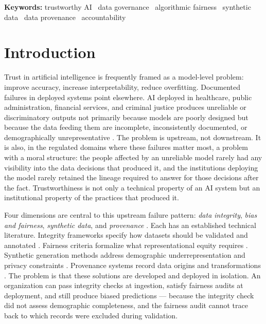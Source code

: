 \documentclass[11pt]{article}
\begin{document}
\vspace{0.5em}
\noindent\textbf{Keywords:} trustworthy AI \textperiodcentered\ data governance \textperiodcentered\ algorithmic fairness \textperiodcentered\ synthetic data \textperiodcentered\ data provenance \textperiodcentered\ accountability

\section{Introduction}
\label{sec:intro}

Trust in artificial intelligence is frequently framed as a model-level problem: improve accuracy, increase interpretability, reduce overfitting. Documented failures in deployed systems point elsewhere. AI deployed in healthcare, public administration, financial services, and criminal justice produces unreliable or discriminatory outputs not primarily because models are poorly designed but because the data feeding them are incomplete, inconsistently documented, or demographically unrepresentative \cite{Afroogh2024,Alzubaidi2023}. The problem is upstream, not downstream. It is also, in the regulated domains where these failures matter most, a problem with a moral structure: the people affected by an unreliable model rarely had any visibility into the data decisions that produced it, and the institutions deploying the model rarely retained the lineage required to answer for those decisions after the fact. Trustworthiness is not only a technical property of an AI system but an institutional property of the practices that produced it.

Four dimensions are central to this upstream failure pattern: \emph{data integrity}, \emph{bias and fairness}, \emph{synthetic data}, and \emph{provenance} \cite{NIST_AIRM_2023}. Each has an established technical literature. Integrity frameworks specify how datasets should be validated and annotated \cite{Schwabe2024}. Fairness criteria formalize what representational equity requires \cite{calders2010naivebayes,hardt2016equality,kusner2017counterfactual}. Synthetic generation methods address demographic underrepresentation and privacy constraints \cite{ShahulHameed2024}. Provenance systems record data origins and transformations \cite{Ahmed2023}. The problem is that these solutions are developed and deployed in isolation. An organization can pass integrity checks at ingestion, satisfy fairness audits at deployment, and still produce biased predictions --- because the integrity check did not assess demographic completeness, and the fairness audit cannot trace back to which records were excluded during validation.
\end{document}
